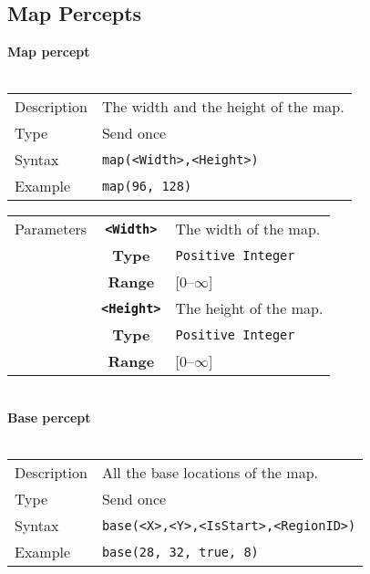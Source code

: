 \subsection{Map Percepts}
\textbf{Map percept}\\
\\
\begin{tabularx}{\textwidth}{lX}
 Description & The width and the height of the map. \\
 Type & Send once \\
 Syntax & \verb|map(<Width>,<Height>)| \\
 Example & \verb|map(96, 128)| \\   
 \end{tabularx}
 \begin{tabularx}{\textwidth}{l | c | p{8cm}|}
 \cline{2-3} 
  Parameters & \textbf{\verb|<Width>|} & The width of the map.\\
            & \textbf{Type} & \verb|Positive Integer| \\
            & \textbf{Range} & [0--$\infty$] \\
            \cline{2-3} 
            & \textbf{\verb|<Height>|} & The height of the map. \\
            & \textbf{Type} & \verb|Positive Integer| \\
            & \textbf{Range} & [0--$\infty$] \\
            \cline{2-3} 
\end{tabularx}\\
 \newpage
\noindent
\textbf{Base percept}\\
\\
\begin{tabularx}{\textwidth}{lX}
 Description & All the base locations of the map. \\
 Type & Send once \\
 Syntax & \verb|base(<X>,<Y>,<IsStart>,<RegionID>)| \\
 Example & \verb|base(28, 32, true, 8)| \\  
 \end{tabularx}
